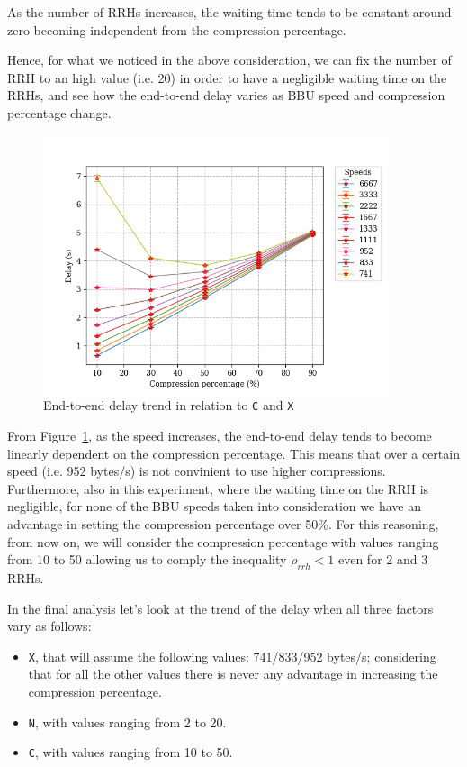 \documentclass[11pt,a4paper,oneside, openright]{article}
\begin{document}
As the number of RRHs increases, the waiting time tends to be constant around zero becoming independent from the compression percentage.


Hence, for what we noticed in the above consideration, we can fix the number of RRH to an high value (i.e. 20) in order to have a negligible waiting time on the RRHs, and see how the end-to-end delay varies as BBU speed and compression percentage change.

\begin{figure}[h]
	\centering
	\includegraphics[width=0.9\textwidth]{images/c-vs-delay}
	\caption{End-to-end delay trend in relation to \texttt{C} and \texttt{X}}
	\label{fig:c-vs-delay}
\end{figure}

From Figure~\ref{fig:c-vs-delay}, as the speed increases, the end-to-end delay tends to become linearly dependent on the compression percentage. This means that over a certain speed (i.e. 952 bytes/s) is not convinient to use higher compressions. Furthermore, also in this experiment, where the waiting time on the RRH is negligible, for none of the BBU speeds taken into consideration we have an advantage in setting the compression percentage over 50\%. For this reasoning, from now on, we will consider the compression percentage with values ranging from 10 to 50 allowing us to comply the inequality $ \rho_{rrh} < 1$ even for 2 and 3 RRHs.


In the final analysis let's look at the trend of the delay when all three factors vary as follows:

\begin{itemize}
	\item \texttt{X}, that will assume the following values: 741/833/952 bytes/s; considering that for all the other values there is never any advantage in increasing the compression percentage.
	\item \texttt{N}, with values ranging from 2 to 20.
	\item \texttt{C}, with values ranging from 10 to 50.
\end{itemize}
\end{document}
